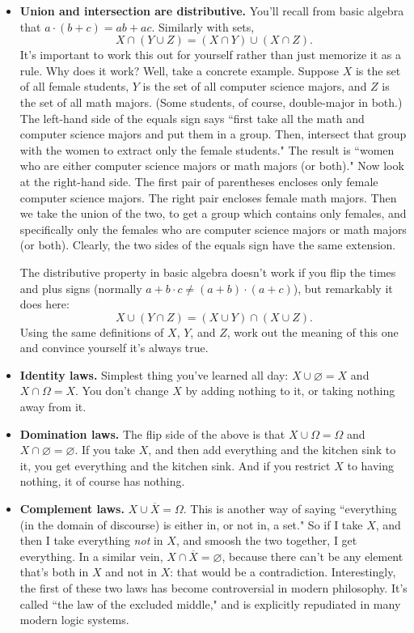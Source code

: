 \begin{itemize}
\item \textbf{Union and intersection are distributive.}
\label{distributivelaw} You'll recall from basic algebra that $a \cdot
(b+c) = ab + ac$. Similarly with sets,
\[
X \cap (Y \cup Z) = (X \cap Y) \cup (X \cap Z).
\]
It's important to work this out for yourself rather than just memorize it
as a rule. Why does it work? Well, take a concrete example. Suppose $X$ is
the set of all female students, $Y$ is the set of all computer science
majors, and $Z$ is the set of all math majors. (Some students, of course,
double-major in both.) The left-hand side of the equals sign says ``first
take all the math and computer science majors and put them in a group.
Then, intersect that group with the women to extract only the female
students." The result is ``women who are either computer science majors or
math majors (or both)." Now look at the right-hand side. The first pair of
parentheses encloses only female computer science majors. The right pair
encloses female math majors. Then we take the union of the two, to get a
group which contains only females, and specifically only the females who
are computer science majors or math majors (or both). Clearly, the two
sides of the equals sign have the same extension.

The distributive property in basic algebra doesn't work if you flip the
times and plus signs (normally $a+b\cdot c \neq (a+b)\cdot (a+c)$), but
remarkably it does here:
\[
X \cup (Y \cap Z) = (X \cup Y) \cap (X \cup Z).
\]
Using the same definitions of $X$, $Y$, and $Z$, work out the meaning of
this one and convince yourself it's always true.

\item \textbf{Identity laws.}  Simplest thing you've learned all day: $X
\cup \varnothing = X$ and $X \cap \Omega = X$. You don't change $X$ by
adding nothing to it, or taking nothing away from it.

\item \textbf{Domination laws.}  The flip side of the above is that $X \cup
\Omega = \Omega$ and $X \cap \varnothing = \varnothing$. If you take $X$,
and then add everything and the kitchen sink to it, you get everything and
the kitchen sink. And if you restrict $X$ to having nothing, it of course
has nothing.

\item \textbf{Complement laws.} $X \cup \overline{X}  = \Omega$.
 This is another
way of saying ``everything (in the domain of discourse)  is either in, or
not in, a set." So if I take $X$, and then I take everything \textit{not}
in $X$, and smoosh the two together, I get everything. In a similar vein,
$X \cap \overline{X} = \varnothing$,  because there can't be any element that's
both in $X$ and not in $X$: that would be a contradiction. Interestingly,
the first of these two laws has become controversial in modern philosophy.
It's called ``the law of the excluded middle,"  and is explicitly repudiated in many modern logic systems.


\end{itemize}

